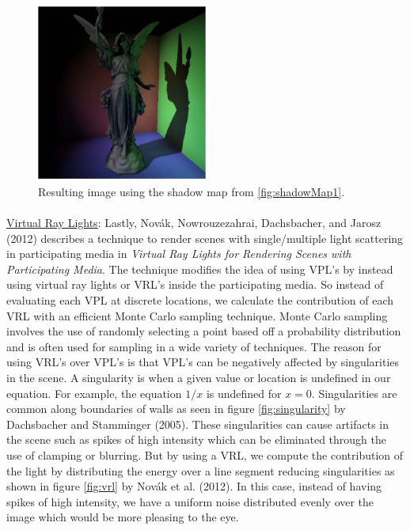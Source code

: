 \begin{figure}[h!]
  \centering
    \includegraphics[width=0.5\textwidth]{shadowMap2.jpg}
  \caption{Resulting image using the shadow map from \ref{fig:shadowMap1}.}
	\label{fig:shadowMap2}
\end{figure}

\paragraph{}
\underline{Virtual Ray Lights}: Lastly, Novák, Nowrouzezahrai, Dachsbacher, and Jarosz (2012) describes a technique to render scenes with single/multiple light scattering in participating media in \textit{Virtual Ray Lights for Rendering Scenes with Participating Media}.  The technique modifies the idea of using VPL's by instead using virtual ray lights or VRL's inside the participating media.  So instead of evaluating each VPL at discrete locations, we calculate the contribution of each VRL with an efficient Monte Carlo sampling technique.  Monte Carlo sampling involves the use of randomly selecting a point based off a probability distribution and is often used for sampling in a wide variety of techniques.  The reason for using VRL's over VPL's is that VPL's can be negatively affected by singularities in the scene.  A singularity is when a given value or location is undefined in our equation.  For example, the equation $1/x$ is undefined for $x=0$.  Singularities are common along boundaries of walls as seen in figure \ref{fig:singularity} by Dachsbacher and Stamminger (2005).  These singularities can cause artifacts in the scene such as spikes of high intensity which can be eliminated through the use of clamping or blurring.  But by using a VRL, we compute the contribution of the light by distributing the energy over a line segment reducing singularities as shown in figure \ref{fig:vrl} by Novák et al. (2012).  In this case, instead of having spikes of high intensity, we have a uniform noise distributed evenly over the image which would be more pleasing to the eye.

